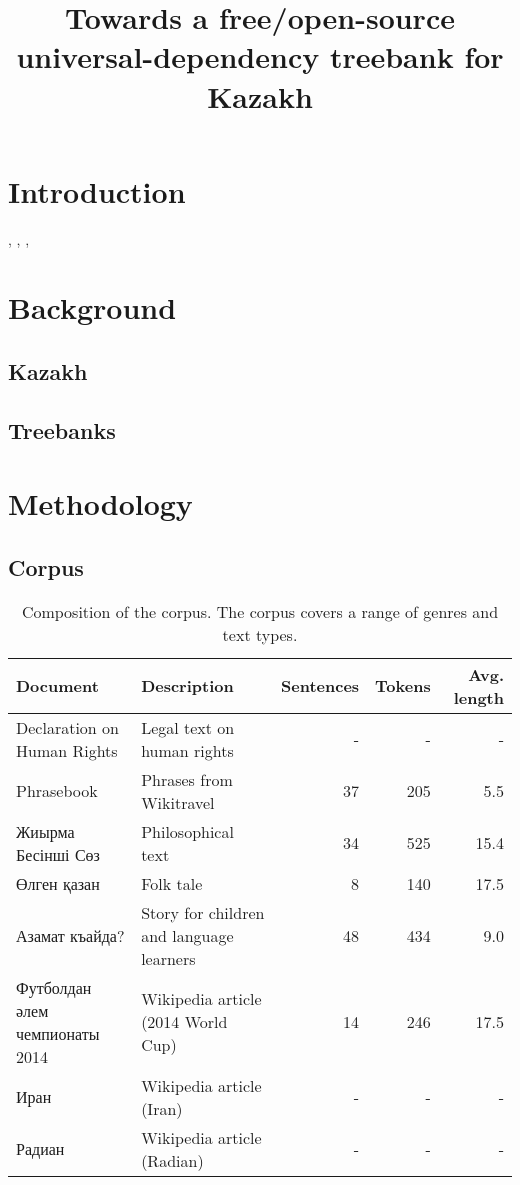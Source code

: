 \documentclass[a4paper,11pt, onecolumn]{article}
\title{Towards a free/open-source universal-dependency treebank for Kazakh}
\begin{document}
\maketitleabstract{}


\section{Introduction}

\citet{Lynn12}, \citet{Atalay03}, \citet{Oflazer03}, \citet{DeMarneffe14}

\section{Background}

\subsection{Kazakh}

\subsection{Treebanks} %

\section{Methodology}

\subsection{Corpus}

\begin{table}
  \centering
  \begin{tabular}{|l|l|r|r|r|}
    \hline
    \textbf{Document} & \textbf{Description} & \textbf{Sentences} & \textbf{Tokens} & \textbf{Avg. length}\\
    \hline
    Declaration on Human Rights & Legal text on human rights & - & - & - \\
    Phrasebook & Phrases from Wikitravel & 37 & 205 & 5.5 \\
    Жиырма Бесінші Сөз & Philosophical text & 34 & 525 & 15.4 \\ 
    Өлген қазан & Folk tale & 8 & 140 & 17.5 \\
    Азамат къайда? & Story for children and language learners & 48 & 434 & 9.0 \\
    Футболдан әлем чемпионаты 2014  & Wikipedia article (2014 World Cup) & 14 & 246 & 17.5 \\
    Иран & Wikipedia article (Iran) & - & - & - \\
    Радиан & Wikipedia article (Radian) & - & - & - \\
    \hline
  \end{tabular}
  \caption{Composition of the corpus. The corpus covers a range of genres and text types.}
\end{table}
\end{document}
